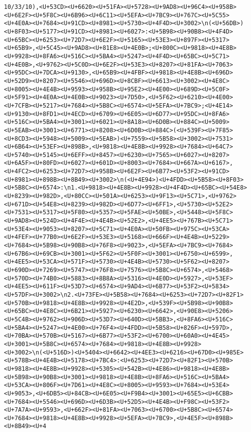 \documentclass[
]{article}
\begin{document}
\begin{verbatim}
10/33/10),<U+53CD><U+6620><U+51FA><U+5728><U+9AD8><U+96C4><U+958B><U+6E2F><U+5F8C><U+6B96><U+6C11><U+5EFA><U+7BC9><U+767C><U+5C55><U+4E0A><U+7684><U+91CD><U+8981><U+5730><U+4F4D><U+3002>\n(<U+56DB>)<U+8F03><U+5177><U+91CD><U+8981><U+6027>:<U+5B98><U+90B8><U+4F4D><U+65BC><U+6253><U+72D7><U+6E2F><U+5165><U+53E3><U+897F><U+5317><U+65B9>,<U+5C45><U+9AD8><U+81E8><U+4E0B>;<U+800C><U+9818><U+4E8B><U+9928><U+8FA6><U+516C><U+5BA4><U+5247><U+4F4D><U+65BC><U+5C71><U+4E0B>,<U+9762><U+5C0D><U+6E2F><U+53E3><U+8207><U+81FA><U+7063><U+95DC><U+7DCA><U+9130>,<U+65B9><U+4FBF><U+9818><U+4E8B><U+696D><U+52D9><U+8207><U+5546><U+696D><U+8CBF><U+6613><U+3002><U+4E8C><U+8005><U+4E4B><U+9593><U+958B><U+95E2><U+4E00><U+689D><U+5C0F><U+5F91><U+4E0A><U+4E0B><U+9023><U+7D50>,<U+5F62><U+6210><U+4E00><U+7CFB><U+5217><U+7684><U+5B8C><U+6574><U+5EFA><U+7BC9>;<U+4E14><U+9130><U+8FD1><U+4ECD><U+6709><U+6E05><U+6D77><U+95DC><U+8FA6><U+516C><U+5BA4><U+3001><U+6021><U+8A18><U+6D0B><U+884C><U+5009><U+5EAB><U+3001><U+6771><U+8208><U+6D0B><U+884C>(<U+539F><U+7F85><U+8CD3><U+5948><U+5009><U+5EAB>)<U+7559><U+5B58><U+3002><U+7531><U+6B64><U+53EF><U+898B>,<U+9818><U+4E8B><U+9928><U+7684><U+64C7><U+5740><U+5145><U+6EFF><U+8457><U+6230><U+7565><U+6027><U+8207><U+6A5F><U+80FD><U+6027><U+601D><U+8003><U+7684><U+667A><U+6167>,<U+4FC2><U+6253><U+72D7><U+958B><U+6E2F><U+6B77><U+53F2><U+91CD><U+8981><U+898B><U+8B49><U+3002>\n(<U+4E94>)<U+4FDD><U+5B58><U+8F03><U+5B8C><U+6574>:\n1.<U+9818><U+4E8B><U+9928><U+4F4D><U+65BC><U+54E8><U+8239><U+982D>,<U+80CC><U+501A><U+6253><U+9F13><U+5C71>,<U+9762><U+671D><U+54E8><U+8239><U+982D><U+6D77><U+6FF1>,<U+5730><U+52E2><U+7531><U+5317><U+5F80><U+5357><U+5FAE><U+50BE>,<U+5448><U+5F8C><U+9AD8><U+524D><U+4F4E><U+4E4B><U+52E2>,<U+4EE5><U+767B><U+5C71><U+53E4><U+9053><U+8207><U+5C71><U+4E0A><U+50FB><U+975C><U+53CA><U+4FEF><U+77B0><U+6E2F><U+53E3><U+5168><U+666F><U+4E4B><U+5229><U+7684><U+5B98><U+90B8><U+76F8><U+9023>,<U+5EFA><U+7BC9><U+7684><U+67B6><U+69CB><U+3001><U+5F62><U+5F0F><U+3001><U+6750><U+6599>,<U+4EE5><U+53CA><U+571F><U+5730><U+4E4B><U+5730><U+5F62><U+8207><U+690D><U+7269><U+5747><U+76F8><U+7576><U+5B8C><U+6574>,<U+5468><U+570D><U+74B0><U+5883><U+8B8A><U+5316><U+4E0D><U+5927>,<U+53EF><U+4EE5><U+611F><U+53D7><U+6574><U+9AD4><U+6B77><U+53F2><U+5834><U+57DF><U+3002>\n2.<U+73FE><U+5B58><U+7684><U+6253><U+72D7><U+82F1><U+570B><U+9818><U+4E8B><U+9928><U+4E2D>,<U+539F><U+5B98><U+90B8><U+65BC><U+4E8C><U+6B21><U+5927><U+6230><U+6642>,<U+90E8><U+5206><U+5C4B><U+9762><U+906D><U+53D7><U+640D><U+5BB3>,<U+8FA6><U+516C><U+5BA4><U+5247><U+4E00><U+76F4><U+4FDD><U+5B58><U+826F><U+597D>,<U+70BA><U+570B><U+5167><U+6B77><U+53F2><U+6700><U+60A0><U+4E45><U+3001><U+5B8C><U+6574><U+7684><U+9818><U+4E8B><U+9928><U+3002>\n(<U+516D>)<U+5404><U+6642><U+4EE3><U+6216><U+67D0><U+985E><U+578B><U+4E4B><U+5178><U+7BC4>:<U+6253><U+72D7><U+82F1><U+570B><U+9818><U+4E8B><U+9928><U+5305><U+542B><U+4E86><U+9818><U+4E8B><U+5B98><U+90B8><U+3001><U+9818><U+4E8B><U+8FA6><U+516C><U+5BA4><U+53CA><U+806F><U+7D61><U+4E8C><U+8005><U+9593><U+7684><U+53E4><U+9053>,<U+6DB5><U+84CB><U+6E05><U+F9B4><U+3001><U+65E5><U+6CBB><U+7684><U+5546><U+696D><U+6D3B><U+52D5><U+4E4B><U+F98C><U+53F2><U+7A7A><U+9593>,<U+662F><U+81FA><U+7063><U+6700><U+5B8C><U+6574><U+7684><U+9818><U+4E8B><U+9928><U+5EFA><U+7BC9>,<U+4E5F><U+898B><U+8B49><U+4
\end{verbatim}
\end{document}
